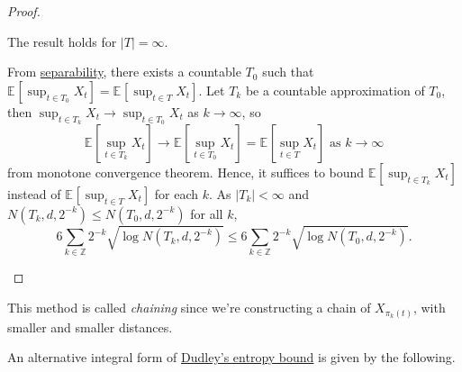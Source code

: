 \begin{proof}
	\begin{claim}
		The result holds for \(\vert T \vert = \infty \).
	\end{claim}
	\begin{explanation}
		From \hyperref[def:separable]{separability}, there exists a countable \(T_0\) such that \(\mathbb{E}_{}\left[\sup _{t\in T_0} X_t \right] = \mathbb{E}_{}\left[\sup _{t\in T} X_t \right] \). Let \(T_k\) be a countable approximation of \(T_0\), then \(\sup _{t\in T_k} X_t \to \sup _{t\in T_0} X_t \) as \(k \to \infty\), so
		\[
			\mathbb{E}_{}\left[\sup _{t\in T_k} X_t \right] \to  \mathbb{E}_{}\left[\sup _{t\in T_0} X_t \right] = \mathbb{E}_{}\left[\sup _{t\in T} X_t \right] \text{ as }k \to \infty
		\]
		from monotone convergence theorem. Hence, it suffices to bound \(\mathbb{E}_{}\left[\sup _{t\in T_k} X_t \right] \) instead of \(\mathbb{E}_{}\left[\sup _{t\in T} X_t \right] \) for each \(k\). As \(\vert T_k \vert < \infty \) and \(N(T_k, d, 2^{-k}) \leq N(T_0, d, 2^{-k})\) for all \(k\),
		\[
			6 \sum_{k\in \mathbb{Z} } 2^{-k} \sqrt{\log N(T_k, d, 2^{-k})} \leq 6 \sum_{k\in \mathbb{Z} } 2^{-k} \sqrt{\log N(T_0, d, 2^{-k})} .
		\]
	\end{explanation}
\end{proof}

\begin{note}\label{note:chaining}
	This method is called \emph{chaining} since we're constructing a chain of \(X_{\pi _{k}(t)}\), with smaller and smaller distances.
	\begin{figure}[H]
		\centering
	\end{figure}
\end{note}

An alternative integral form of \hyperref[thm:Dudley-entropy-bound]{Dudley's entropy bound} is given by the following.

